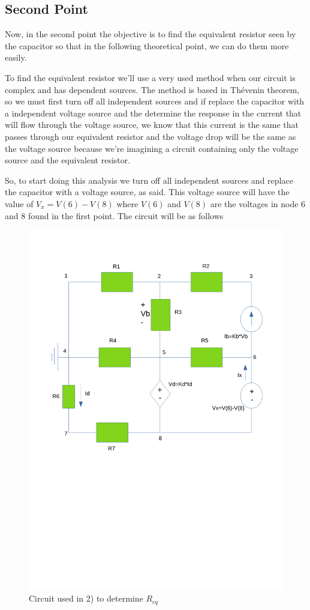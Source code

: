 
\subsection{Second Point}
\label{ssec:2T}

\noindent \par Now, in the second point the objective is to find the equivalent resistor seen by the capacitor so that in the following theoretical point, we can do them more easily.
\par To find the equivalent resistor we'll use a very used method when our circuit is complex and has dependent sources. The method is based in Thévenin theorem, so we must first turn off all independent sources and if replace the capacitor with a independent voltage source and the determine the response in the current that will flow through the voltage source, we know that this current is the same that passes through our equivalent resistor and the voltage drop will be the same as the voltage source because we're imagining a circuit containing only the voltage source and the equivalent resistor. 
\par So, to start doing this analysis we turn off all independent sources and replace the capacitor with a voltage source, as said. This voltage source will have the value of $V_x=V(6)-V(8)$ where $V(6)$ and $V(8)$ are the voltages in node 6 and 8 found in the first point. The circuit will be as follows

\begin{figure}[H] \centering
\includegraphics[width=0.6\linewidth]{esquema.pdf}
\caption{Circuit used in 2) to determine $R_{eq}$}
\label{fig:Cir_2)}
\end{figure}

